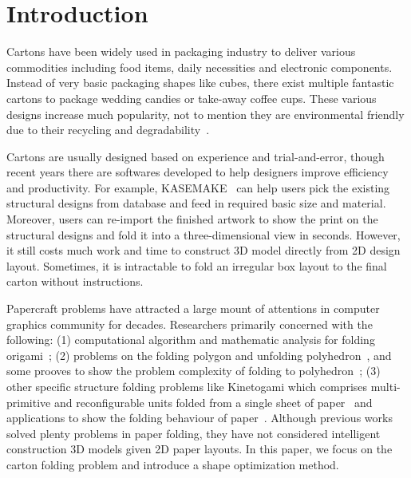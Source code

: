 \section{Introduction}

Cartons have been widely used in packaging industry to deliver various commodities including food items, daily necessities and electronic components. Instead of very basic packaging shapes like cubes, there exist multiple fantastic cartons to package wedding candies or take-away coffee cups. These various designs increase much popularity, not to mention they are environmental friendly due to their recycling and degradability~\cite{Mullineux:2010:CSC:1739328.1739673}.

Cartons are usually designed based on experience and trial-and-error, though recent years there are softwares developed to help designers improve efficiency and productivity.
For example, KASEMAKE~\cite{KASEMAKE} can help users pick the existing structural designs from database and feed in required basic size and material.
Moreover, users can re-import the finished artwork to show the print on the structural designs and fold it into a three-dimensional view in seconds. 
However, it still costs much work and time to construct 3D model directly from 2D design layout. Sometimes, it is intractable to fold an irregular box layout to the final carton without instructions.

Papercraft problems have attracted a large mount of attentions in computer graphics community for decades.
Researchers primarily concerned with the following: (1) computational algorithm and mathematic analysis for folding origami~\cite{Ida:2007:MOC:1802954.1803021,Lang:1996:CAO:237218.237249,xl-idetc-14}; (2) problems on the folding polygon and unfolding polyhedron~\cite{Bern:2003:UPC:636968.636970,O'Rourke:1998:FUC:646319.686376,Rourke2008Unfolding}, and some prooves to show the problem complexity of folding to polyhedron~\cite{Biedl:2005:NFP:1090462.1646553,Biedl2004When,Lubiw1996When}; (3) other specific structure folding problems like Kinetogami which comprises multi-primitive and reconfigurable units folded from a single sheet of paper~\cite{Gao2013Kinetogami} and applications to show the folding behaviour of paper~\cite{Thiel1998,Kishi:1998:OFP:786112.786279,Nimnual2007Virtual,Shimanuki2009Construction}. 
%
Although previous works solved plenty problems in paper folding, they have not considered intelligent construction 3D models given 2D paper layouts. 
In this paper, we focus on the carton folding problem and introduce a shape optimization method.

